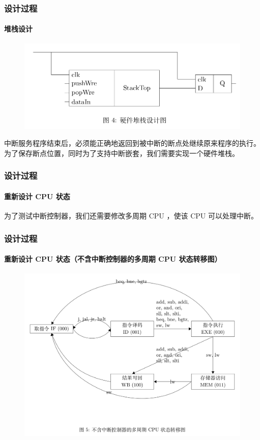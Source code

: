 \documentclass[xcolor=dvipsnames]{beamer}
\begin{document}
\begin{frame}
	\frametitle{设计过程}
	\framesubtitle{堆栈设计}	
	
	\begin{figure}
		\centering
		\includegraphics[scale=0.25]{img/4.png}
	\end{figure}
	
	中断服务程序结束后，必须能正确地返回到被中断的断点处继续原来程序的执行。为了保存断点位置，同时为了支持中断嵌套，我们需要实现一个硬件堆栈。
\end{frame}	

\begin{frame}
	\frametitle{设计过程}
	\framesubtitle{重新设计 CPU 状态}
	
	为了测试中断控制器，我们还需要修改多周期 CPU ，使该 CPU 可以处理中断。
	
\end{frame}

\begin{frame}
	\frametitle{设计过程}
	\framesubtitle{重新设计 CPU 状态（不含中断控制器的多周期 CPU 状态转移图）}
	
	\begin{figure}
		\centering
		\includegraphics[scale=0.25]{img/5.png}
	\end{figure}
\end{frame}
\end{document}
